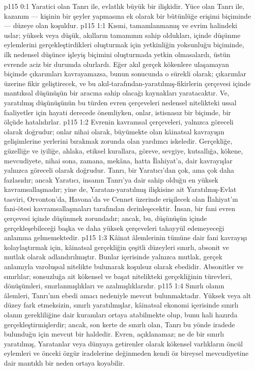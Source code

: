 \vs p115 0:1 Yaratici olan Tanrı ile, evlatlık büyük bir ilişkidir. Yüce olan Tanrı ile, kazanım --- kişinin bir şeyler yapmasına ek olarak bir bütünlüğe erişimi biçiminde --- düzeye olan koşuldur.
\vs p115 1:1 Kısmi, tamamlanmamış ve evrim halindeki uslar; yüksek veya düşük, akılların tamamının sahip oldukları, içinde düşünme eylemlerini gerçekleştirdikleri  oluşturmak için yetkinliğin yoksunluğu biçiminde, ilk nedensel düşünce işleyiş biçimini oluşturmada yetkin olmasalardı, üstün evrende aciz bir durumda olurlardı. Eğer akıl gerçek kökenlere ulaşamayan biçimde çıkarımları kavrayamazsa, bunun sonucunda o sürekli olarak; çıkarımlar üzerine fikir geliştirecek, ve bu akıl\hyp{}tarafından\hyp{}yaratılmış\hyp{}fikirlerin çerçevesi içinde mantıksal düşünüşün bir aracına sahip olacağı kaynakları yaratacaktır. Ve, yaratılmış düşünüşünün bu türden evren çerçeveleri nedensel nitelikteki ussal faaliyetler için hayati derecede önemliyken, onlar, istisnasız bir biçimde, bir ölçüde hatalıdırlar.
\vs p115 1:2 Evrenin kavramsal çerçeveleri, yalnızca göreceli olarak doğrudur; onlar nihai olarak, büyümekte olan kâinatsal kavrayışın gelişimlerine yerlerini bırakmak zorunda olan yardımcı iskeledir. Gerçekliğe, güzelliğe ve iyiliğe, ahlaka, etiksel kurallara, göreve, sevgiye, kutsallığa, kökene, mevcudiyete, nihai sona, zamana, mekâna, hatta İlahiyat’a, dair kavrayışlar yalnızca göreceli olarak doğrudur. Tanrı, bir Yaratıcı’dan çok, ama çok daha fazlasıdır; ancak Yaratıcı, insanın Tanrı’ya dair sahip olduğu en yüksek kavramsallaşmadır; yine de, Yaratan\hyp{}yaratılmış ilişkisine ait Yaratılmış\hyp{}Evlat tasviri, Orvonton’da, Havona’da ve Cennet üzerinde erişilecek olan İlahiyat’ın fani\hyp{}ötesi kavramsallaşmaları tarafından derinleşecektir. İnsan, bir fani evren çerçevesi içinde düşünmek zorundadır; ancak, bu, düşünüşün içinde gerçekleşebileceği başka ve daha yüksek çerçeveleri tahayyül edemeyeceği anlamına gelmemektedir.
\vs p115 1:3 Kâinat âlemlerinin tümüne dair fani kavrayışı kolaylaştırmak için, kâinatsal gerçekliğin çeşitli düzeyleri sınırlı, absonit ve mutlak olarak adlandırılmıştır. Bunlar içerisinde yalnızca mutlak, gerçek anlamıyla varoluşsal nitelikte bulunarak koşulsuz olarak ebedidir. Absonitler ve sınırlılar; sonsuzluğa ait kökensel ve başat nitelikteki gerçekliğinin türevleri, dönüşümleri, sınırlanmışlıkları ve azalmışlıklarıdır.
\vs p115 1:4 Sınırlı olanın âlemleri, Tanrı’nın ebedi amacı nedeniyle mevcut bulunmaktadır. Yüksek veya alt düzey fark etmeksizin, sınırlı yaratılmışlar, kâinatsal ekonomi içerisinde sınırlı olanın gerekliliğine dair kuramları ortaya atabilmekte olup, bunu hali hazırda gerçekleştirmişlerdir; ancak, son kerte de sınırlı olan, Tanrı bu yönde iradede bulunduğu için mevcut bir haldedir. Evren, açıklanamaz; ne de bir sınırlı yaratılmış, Yaratanlar veya dünyaya getirenler olarak kökensel varlıkların öncül eylemleri ve önceki özgür iradelerine değinmeden kendi öz bireysel mevcudiyetine dair mantıklı bir neden ortaya koyabilir.
